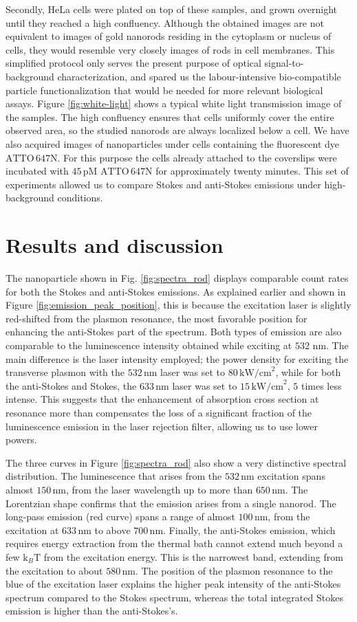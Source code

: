 \documentclass[journal=nalefd,manuscript=letter]{achemso}
\newcommand{\nm}{\ensuremath{\,\textrm{nm}}}
\newcommand{\pM}{\ensuremath{\,\textrm{pM}}}
\newcommand{\pwr}{\ensuremath{\,\textrm{kW/cm}^2}}
\newcommand{\atto}{\ensuremath{\textrm{ATTO}\,647\textrm{N}}}
\begin{document}
Secondly, HeLa cells were plated on top of these samples, and grown overnight
until they reached a high confluency. Although the obtained images are not
equivalent to images of gold nanorods residing in the cytoplasm or nucleus of
cells, they would resemble very closely images of rods in cell membranes. This
simplified protocol only serves the present purpose of optical
signal-to-background characterization, and spared us the labour-intensive
bio-compatible particle functionalization that would be needed for more relevant
biological assays. Figure \ref{fig:white-light} shows a typical white light
transmission image of the samples. The high confluency ensures that cells
uniformly cover the entire observed area, so the studied nanorods are always
localized below a cell. We have also acquired images of nanoparticles under
cells containing the fluorescent dye $\atto$. For this purpose the cells already
attached to the coverslips were incubated with $45\pM$ $\atto$ for approximately
twenty minutes. This set of experiments allowed us to compare Stokes and
anti-Stokes emissions under high-background conditions.

\section{Results and discussion}

The nanoparticle shown in Fig. \ref{fig:spectra_rod} displays comparable count
rates for both the Stokes and anti-Stokes emissions. As explained earlier and
shown in Figure \ref{fig:emission_peak_position}, this is because the excitation
laser is slightly red-shifted from the plasmon resonance, the most favorable
position for enhancing the anti-Stokes part of the spectrum. Both types of
emission are also comparable to the luminescence intensity obtained while
exciting at $532\,\nm$. The main difference is the laser intensity employed; the
power density for exciting the transverse plasmon with the $532\nm$ laser was
set to $80\pwr$, while for both the anti-Stokes and Stokes, the $633\nm$ laser
was set to $15\pwr$, $5$ times less intense. This suggests that the enhancement
of absorption cross section at resonance more than compensates the loss of a
significant fraction of the luminescence emission in the laser rejection filter,
allowing us to use lower powers.

The three curves in Figure \ref{fig:spectra_rod} also show a very distinctive
spectral distribution. The luminescence that arises from the $532\nm$ excitation
spans almost $150\nm$, from the laser wavelength up to more than $650\nm$. The
Lorentzian shape confirms that the emission arises from a single nanorod. The
long-pass emission (red curve) spans a range of almost $100\nm$, from the
excitation at $633\nm$ to above $700\nm$. Finally, the anti-Stokes emission,
which requires energy extraction from the thermal bath cannot extend much beyond
a few $\textrm{k}_{B}\textrm{T}$ from the excitation energy. This is the
narrowest band, extending from the excitation to about $580\nm$. The position of
the plasmon resonance to the blue of the excitation laser explains the higher
peak intensity of the anti-Stokes spectrum compared to the Stokes spectrum,
whereas the total integrated Stokes emission is higher than the anti-Stokes's.
\end{document}
